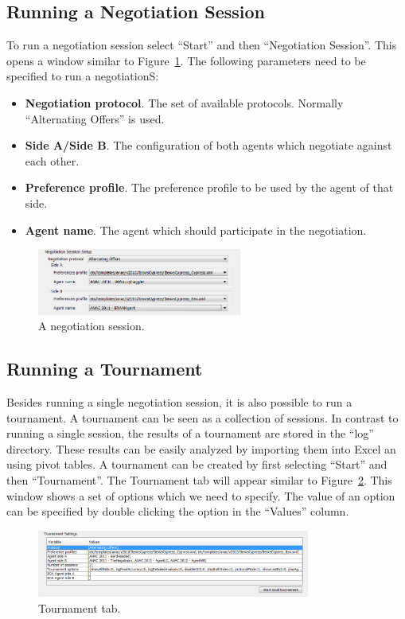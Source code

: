 \documentclass[]{article}
\begin{document}
\subsection{Running a Negotiation Session}
To run a negotiation session select ``Start'' and then ``Negotiation Session''. This opens a window similar to Figure~\ref{Fig:session}. The following parameters need to be specified to run a negotiationS:
\begin{itemize}
	\item \textbf{Negotiation protocol}. The set of available protocols. Normally ``Alternating Offers'' is used.
	\item \textbf{Side A/Side B}. The configuration of both agents which negotiate against each other.
	\item \textbf{Preference profile}. The preference profile to be used by the agent of that side.
	\item \textbf{Agent name}. The agent which should participate in the negotiation.
\end{itemize}

\begin{figure}[htb]
	\centering
	\includegraphics[width=0.6\textwidth]{media/image11.png}
\caption{A negotiation session.}\label{Fig:session}
\end{figure}


\subsection{Running a Tournament}
Besides running a single negotiation session, it is also possible to run a tournament. A tournament can be seen as a collection of sessions. In contrast to running a single session, the results of a tournament are stored in the ``log'' directory. These results can be easily analyzed by importing them into Excel an using pivot tables. A tournament can be created by first selecting ``Start'' and then ``Tournament''. The Tournament tab will appear similar to Figure~\ref{Fig:tournament}. This window shows a set of options which we need to specify. The value of an option can be specified by double clicking the option in the ``Values'' column.


\begin{figure}[htb]
	\centering
	\includegraphics[width=0.8\textwidth]{media/image16.png}
\caption{Tournament tab.}\label{Fig:tournament}
\end{figure}
\end{document}
